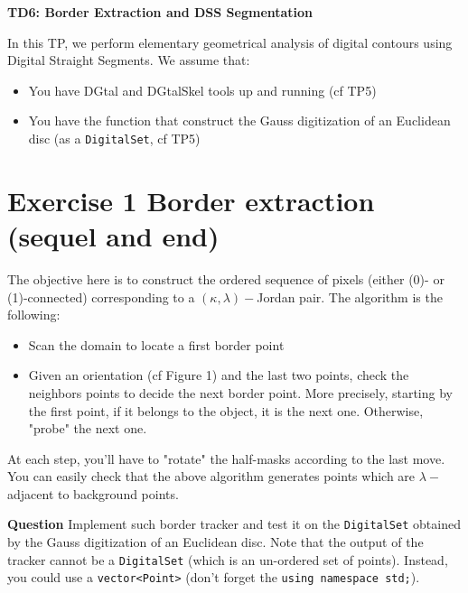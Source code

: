 \documentclass[a4paper, 11pt]{article}
\title{}
\author{}
\date{}
\begin{document}
\begin{center}
	\LARGE \textbf{TD6: Border Extraction and DSS Segmentation}
\end{center}

\bigskip
\par In this TP, we perform elementary geometrical analysis of digital contours using Digital Straight Segments. We assume that:
\begin{itemize}
	\item You have DGtal and DGtalSkel tools up and running (cf TP5)
	\item You have the function that construct the Gauss digitization of an Euclidean disc (as a \texttt{DigitalSet}, cf TP5)
\end{itemize}

\section*{Exercise 1 \rm Border extraction (sequel and end)}

\par The objective here is to construct the ordered sequence of pixels (either (0)- or (1)-connected) corresponding to a $(\kappa,\lambda)-$Jordan pair. The algorithm is the following:
\begin{itemize}
	\item Scan the domain to locate a first border point
	\item Given an orientation (cf Figure 1) and the last two points, check the neighbors points to decide the next border point. More precisely, starting by the first point, if it belongs to the object, it is the next one. Otherwise, "probe" the next one.
\end{itemize}

\par At each step, you'll have to "rotate" the half-masks according to the last move. You can easily check that the above algorithm generates points which are $\lambda-$adjacent to background points.

{\bf Question } Implement such border tracker and test it on the \texttt{DigitalSet} obtained by the Gauss digitization of an Euclidean disc. Note that the output of the tracker cannot be a \texttt{DigitalSet} (which is an un-ordered set of points). Instead, you could use a \texttt{vector<Point>} (don't forget the \texttt{using namespace std;}).
\end{document}
